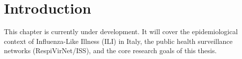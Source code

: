 
\chapter{Introduction}
\label{ch:introduction}

This chapter is currently under development. It will cover the epidemiological context of Influenza-Like Illness (ILI) in Italy, the public health surveillance networks (RespiVirNet/ISS), and the core research goals of this thesis.
